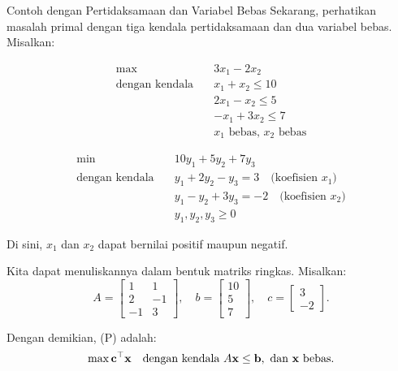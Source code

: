 \begin{example}{Contoh dengan Pertidaksamaan dan Variabel Bebas}{}
Sekarang, perhatikan masalah primal dengan tiga kendala pertidaksamaan dan dua variabel bebas. Misalkan:

\par\noindent
\begin{tcolorbox}[title=Primal (P), colback=blue!5, colframe=blue!60!black, sharp corners=south]
\[
\begin{aligned}
\max\ & 3x_1 - 2x_2 \\
\text{dengan kendala} \quad
& x_1 + x_2 \leq 10 \\
& 2x_1 - x_2 \leq 5 \\
& -x_1 + 3x_2 \leq 7 \\
& x_1 \text{ bebas, } x_2 \text{ bebas}
\end{aligned}
\]
\end{tcolorbox}

\medskip

\begin{tcolorbox}[title=Dual (D), colback=green!5, colframe=green!60!black, sharp corners=south]
\[
\begin{aligned}
\min\ & 10y_1 + 5y_2 + 7y_3 \\
\text{dengan kendala} \quad
& y_1 + 2y_2 - y_3 = 3 \quad \text{(koefisien } x_1) \\
& y_1 - y_2 + 3y_3 = -2 \quad \text{(koefisien } x_2) \\
& y_1, y_2, y_3 \geq 0
\end{aligned}
\]
\end{tcolorbox}
\par

Di sini, $x_1$ dan $x_2$ dapat bernilai positif maupun negatif.

Kita dapat menuliskannya dalam bentuk matriks ringkas. Misalkan:
\[
A = \begin{bmatrix}
1 & 1 \\
2 & -1 \\
-1 & 3
\end{bmatrix}, \quad b = \begin{bmatrix}
10 \\ 5 \\ 7
\end{bmatrix}, \quad c = \begin{bmatrix}
3 \\ -2
\end{bmatrix}.
\]

Dengan demikian, (P) adalah:
\[
\max \mathbf{c}^\top \mathbf{x} \quad \mbox{dengan kendala } A \mathbf{x} \leq \mathbf{b}, \mbox{ dan } \mathbf{x} \mbox{ bebas}.
\]


\end{example}
